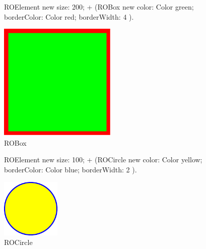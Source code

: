 \documentclass[a4paper,10pt,twoside]{book}
\begin{document}
\begin{figure}[H]
      \begin{minipage}[t]{0.5\textwidth}
      \vspace{0pt}
     \begin{code}
     
ROElement new 
	size: 200; 
	+ (ROBox new 
				color: Color green; 
				borderColor: Color red; 
				borderWidth: 4 ).	\end{code}
   \end{minipage}
   \hfill
   \begin{minipage}[t]{0.4\textwidth}
      \vspace{0pt} \raggedright
       \centering
		\includegraphics[width=0.5\textwidth]{box}
   \end{minipage}
\caption{ROBox}
\label{fig:box}
\end{figure} 

\begin{figure}[H]
      \begin{minipage}[t]{0.5\textwidth}
      \vspace{0pt}
     \begin{code}
     
ROElement new 
	size: 100; 
	+ (ROCircle new 
				color: Color yellow; 
				borderColor: Color blue; 
				borderWidth: 2 ).	\end{code}
   \end{minipage}
   \hfill
   \begin{minipage}[t]{0.4\textwidth}
      \vspace{0pt} \raggedright
       \centering
		\includegraphics[width=0.25\textwidth]{circle}     
   \end{minipage}
\caption{ROCircle}
\label{fig:circle}
\end{figure}
\end{document}

